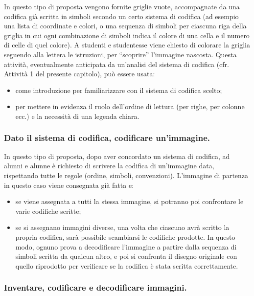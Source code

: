 \ruoliattivita{\ruoloEsecutore}

In questo tipo di proposta vengono fornite griglie vuote, accompagnate da una codifica già scritta in simboli secondo un certo sistema di codifica (ad esempio una lista di coordinate e colori, o una sequenza di simboli per ciascuna riga della griglia in cui ogni combinazione di simboli indica il colore di una cella e il numero di celle di quel colore). A studenti e studentesse viene chiesto di colorare la griglia seguendo alla lettera le istruzioni, per ``scoprire'' l'immagine nascosta. Questa attività, eventualmente anticipata da un'analisi del sistema di codifica (cfr. Attività 1 del presente capitolo), può essere usata:

\begin{itemize}
\item
  come introduzione per familiarizzare con il sistema di codifica scelto;
\item
  per mettere in evidenza il ruolo dell'ordine di lettura (per righe, per colonne ecc.) e la necessità di una legenda chiara.
\end{itemize}

\subsubsection{Dato il sistema di codifica, codificare un’immagine.}

\ruoliattivita{\ruoloProgrammatore}

In questo tipo di proposta, dopo aver concordato un sistema di codifica, ad alunni e alunne è richiesto di scrivere la codifica di un'immagine data, rispettando tutte le regole (ordine, simboli, convenzioni). L'immagine di partenza in questo caso viene consegnata già fatta e:

\begin{itemize}
\item
  se viene assegnata a tutti la stessa immagine, si potranno poi confrontare le varie codifiche scritte;
\item
  se si assegnano immagini diverse, una volta che ciascuno avrà scritto la propria codifica, sarà possibile scambiarsi le codifiche prodotte. In questo modo, ognuno prova a decodificare l'immagine a partire dalla sequenza di simboli scritta da qualcun altro, e poi si confronta il disegno originale con quello riprodotto per verificare se la codifica è stata scritta correttamente.
\end{itemize}

\subsubsection{Inventare, codificare e decodificare immagini.}

